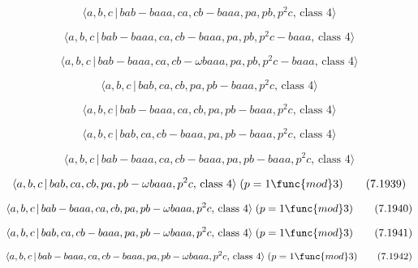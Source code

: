 \documentclass[10pt]{article}
\begin{document}
\begin{equation}
\langle a,b,c\,|\,bab-baaa,ca,cb-baaa,pa,pb,p^2c,\,\text{class }4\rangle 
\tag{7.1932}
\end{equation}

\begin{equation}
\langle a,b,c\,|\,bab-baaa,ca,cb-baaa,pa,pb,p^2c-baaa,\,\text{class }4\rangle
\tag{7.1933}
\end{equation}

\begin{equation}
\langle a,b,c\,|\,bab-baaa,ca,cb-\omega baaa,pa,pb,p^{2}c-baaa,\,\text{class 
}4\rangle  \tag{7.1934}
\end{equation}

\begin{equation}
\langle a,b,c\,|\,bab,ca,cb,pa,pb-baaa,p^2c,\,\text{class }4\rangle 
\tag{7.1935}
\end{equation}

\begin{equation}
\langle a,b,c\,|\,bab-baaa,ca,cb,pa,pb-baaa,p^2c,\,\text{class }4\rangle 
\tag{7.1936}
\end{equation}

\begin{equation}
\langle a,b,c\,|\,bab,ca,cb-baaa,pa,pb-baaa,p^2c,\,\text{class }4\rangle 
\tag{7.1937}
\end{equation}

\begin{equation}
\langle a,b,c\,|\,bab-baaa,ca,cb-baaa,pa,pb-baaa,p^2c,\,\text{class }4\rangle
\tag{7.1938}
\end{equation}

\begin{equation}
\langle a,b,c\,|\,bab,ca,cb,pa,pb-\omega baaa,p^{2}c,\,\text{class }4\rangle
\;(p=1\func{mod}3)  \tag{7.1939}
\end{equation}

\begin{equation}
\langle a,b,c\,|\,bab-baaa,ca,cb,pa,pb-\omega baaa,p^{2}c,\,\text{class }%
4\rangle \;(p=1\func{mod}3)  \tag{7.1940}
\end{equation}

\begin{equation}
\langle a,b,c\,|\,bab,ca,cb-baaa,pa,pb-\omega baaa,p^{2}c,\,\text{class }%
4\rangle \;(p=1\func{mod}3)  \tag{7.1941}
\end{equation}

\begin{equation}
\langle a,b,c\,|\,bab-baaa,ca,cb-baaa,pa,pb-\omega baaa,p^{2}c,\,\text{class 
}4\rangle \;(p=1\func{mod}3)  \tag{7.1942}
\end{equation}
\end{document}
